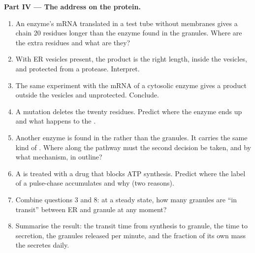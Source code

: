 \begin{problem}
\medskip
\noindent\textbf{Part IV --- The address on the protein.}
\begin{enumerate}[resume]
  \item An enzyme's mRNA translated in a test tube without membranes
        gives a chain \qty{20}{} residues longer than the enzyme found
        in the granules. Where are the extra residues and what are
        they?
  \item With ER vesicles present, the product is the right length,
        inside the vesicles, and protected from a protease. Interpret.
  \item The same experiment with the mRNA of a cytosolic enzyme gives
        a product outside the vesicles and unprotected. Conclude.
  \item A mutation deletes the twenty residues. Predict where the
        enzyme ends up and what happens to the .
  \item Another enzyme is found in the  rather than the
        granules. It carries the same kind of . Where
        along the pathway must the second decision be taken, and by
        what mechanism, in outline?
  \item A  is treated with a drug that blocks ATP synthesis.
        Predict where the label of a pulse-chase accumulates and why
        (two reasons).
  \item Combine questions 3 and 8: at a steady state, how many granules
        are ``in transit'' between ER and granule at any moment?
  \item Summarise the result: the transit time from synthesis to
        granule, the time to secretion, the granules released per
        minute, and the fraction of its own mass the  secretes
        daily.
\end{enumerate}
\end{problem}
